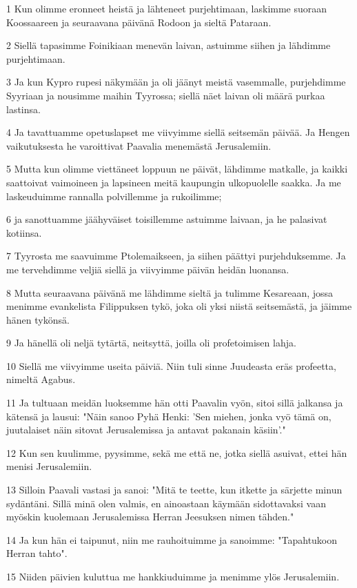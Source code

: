 \par 1 Kun olimme eronneet heistä ja lähteneet purjehtimaan, laskimme suoraan Koossaareen ja seuraavana päivänä Rodoon ja sieltä Pataraan.
\par 2 Siellä tapasimme Foinikiaan menevän laivan, astuimme siihen ja lähdimme purjehtimaan.
\par 3 Ja kun Kypro rupesi näkymään ja oli jäänyt meistä vasemmalle, purjehdimme Syyriaan ja nousimme maihin Tyyrossa; siellä näet laivan oli määrä purkaa lastinsa.
\par 4 Ja tavattuamme opetuslapset me viivyimme siellä seitsemän päivää. Ja Hengen vaikutuksesta he varoittivat Paavalia menemästä Jerusalemiin.
\par 5 Mutta kun olimme viettäneet loppuun ne päivät, lähdimme matkalle, ja kaikki saattoivat vaimoineen ja lapsineen meitä kaupungin ulkopuolelle saakka. Ja me laskeuduimme rannalla polvillemme ja rukoilimme;
\par 6 ja sanottuamme jäähyväiset toisillemme astuimme laivaan, ja he palasivat kotiinsa.
\par 7 Tyyrosta me saavuimme Ptolemaikseen, ja siihen päättyi purjehduksemme. Ja me tervehdimme veljiä siellä ja viivyimme päivän heidän luonansa.
\par 8 Mutta seuraavana päivänä me lähdimme sieltä ja tulimme Kesareaan, jossa menimme evankelista Filippuksen tykö, joka oli yksi niistä seitsemästä, ja jäimme hänen tykönsä.
\par 9 Ja hänellä oli neljä tytärtä, neitsyttä, joilla oli profetoimisen lahja.
\par 10 Siellä me viivyimme useita päiviä. Niin tuli sinne Juudeasta eräs profeetta, nimeltä Agabus.
\par 11 Ja tultuaan meidän luoksemme hän otti Paavalin vyön, sitoi sillä jalkansa ja kätensä ja lausui: "Näin sanoo Pyhä Henki: 'Sen miehen, jonka vyö tämä on, juutalaiset näin sitovat Jerusalemissa ja antavat pakanain käsiin'."
\par 12 Kun sen kuulimme, pyysimme, sekä me että ne, jotka siellä asuivat, ettei hän menisi Jerusalemiin.
\par 13 Silloin Paavali vastasi ja sanoi: "Mitä te teette, kun itkette ja särjette minun sydäntäni. Sillä minä olen valmis, en ainoastaan käymään sidottavaksi vaan myöskin kuolemaan Jerusalemissa Herran Jeesuksen nimen tähden."
\par 14 Ja kun hän ei taipunut, niin me rauhoituimme ja sanoimme: "Tapahtukoon Herran tahto".
\par 15 Niiden päivien kuluttua me hankkiuduimme ja menimme ylös Jerusalemiin.
